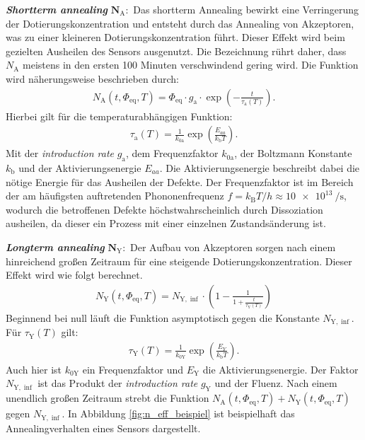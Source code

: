 \textbf{\textit{Shortterm annealing}} $\symbf{N_{\mathrm{A}}}:$ Das shortterm Annealing bewirkt eine Verringerung der Dotierungskonzentration und entsteht durch
das Annealing von Akzeptoren, was zu einer kleineren Dotierungskonzentration führt. Dieser Effekt wird beim
gezielten Ausheilen des Sensors ausgenutzt. Die Bezeichnung rührt daher, dass $N_{\mathrm{A}}$ meistens in den ersten 100 Minuten verschwindend gering wird. Die
Funktion wird näherungsweise beschrieben durch:
\begin{align}
  N_{\mathrm{A}}(t, \Phi_{\mathrm{eq}}, T) = \Phi_{\mathrm{eq}} \cdot g_{\mathrm{a}} \cdot \exp{\left(-\frac{t}{\tau_{\mathrm{a}}(T)}\right)}.
\end{align}
Hierbei gilt für die temperaturabhängigen Funktion:
\begin{align}
  \tau_{\mathrm{a}}(T) = \frac{1}{k_{0\mathrm{a}}}\exp{\left(\frac{E_{aa}}{k_{\mathrm{b}}T}\right)}.
\end{align}
Mit der \textit{introduction rate} $g_{\mathrm{a}}$, dem Frequenzfaktor $k_{0\mathrm{a}}$, der Boltzmann Konstante $k_{\mathrm{b}}$ und
der Aktivierungsenergie $E_{aa}$. Die Aktivierungsenergie beschreibt dabei die nötige Energie für das Ausheilen der Defekte.
Der Frequenzfaktor ist im Bereich der am häufigsten auftretenden Phononenfrequenz ${f = k_{\mathrm{B}}T/h \approx \SI{10e13}{\per\second}}$, wodurch
die betroffenen Defekte höchstwahrscheinlich durch Dissoziation ausheilen, da dieser ein Prozess mit einer einzelnen Zustandsänderung ist.


\textbf{\textit{Longterm annealing}} $\symbf{N_{\mathrm{Y}}}:$ Der Aufbau von
Akzeptoren sorgen nach einem hinreichend großen Zeitraum für eine steigende
Dotierungskonzentration. Dieser Effekt wird wie folgt berechnet.
\begin{align}
  N_{\mathrm{Y}}(t, \Phi_{\mathrm{eq}}, T)     = N_{\mathrm{Y , \inf}}\cdot \left(1 - \frac{1}{1 + \frac{t}{\tau_{\mathrm{Y}}(T)}}\right)
\end{align}
Beginnend bei null läuft die Funktion asymptotisch gegen die Konstante $N_{\mathrm{Y, \inf}}$.
Für $\tau_{\mathrm{Y}}(T)$ gilt:
\begin{align}
  \tau_{\mathrm{Y}}(T) = \frac{1}{k_{0\mathrm{Y}}}\exp{\left(\frac{E_{Y}}{k_{\mathrm{b}}T}\right)}.
\end{align}
Auch hier ist $k_{0\mathrm{Y}}$ ein Frequenzfaktor und $E_{\mathrm{Y}}$ die Aktivierungsenergie. Der Faktor $N_{\mathrm{Y , \inf}}$
ist das Produkt der \textit{introduction rate} $g_{\mathrm{Y}}$ und der Fluenz. Nach einem unendlich großen Zeitraum strebt
die Funktion $N_{\mathrm{A}}(t, \Phi_{\mathrm{eq}}, T) + N_{\mathrm{Y}}(t, \Phi_{\mathrm{eq}}, T)$ gegen $N_{\mathrm{Y , \inf}}$.
In Abbildung \ref{fig:n_eff_beispiel} ist beispielhaft das Annealingverhalten eines
Sensors dargestellt.

